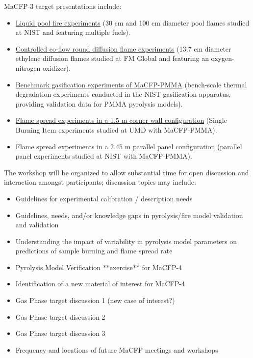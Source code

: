 \documentclass[12pt]{article}
\begin{document}
MaCFP-3 target presentations include:
\begin{itemize}[noitemsep]
\item \href{https://github.com/MaCFP/macfp-db/tree/master/Liquid_Pool_Fires/NIST_Pool_Fires}{Liquid pool fire experiments} (30 cm and 100 cm diameter pool flames studied at NIST and featuring multiple fuels).
\item \href{https://github.com/MaCFP/macfp-db/tree/master/Extinction/FM_Burner}{Controlled co-flow round diffusion flame experiments} (13.7 cm diameter ethylene diffusion flames studied at FM Global and featuring an oxygen-nitrogen oxidizer).
\item \href{https://github.com/MaCFP/macfp-db/tree/master/PMMA/Validation_Data/NIST_Gasification_Apparatus}{Benchmark gasification experiments of MaCFP-PMMA} (bench-scale thermal degradation experiments conducted in the NIST gasification apparatus, providing validation data for PMMA pyrolysis models).
\item \href{https://github.com/MaCFP/macfp-db/tree/master/Fire_Growth/UMD_SBI}{Flame spread experiments in a 1.5 m corner wall configuration} (Single Burning Item experiments studied at UMD with MaCFP-PMMA).
\item \href{https://github.com/MaCFP/macfp-db/tree/master/Fire_Growth/NIST_Parallel_Panel}{Flame spread experiments in a 2.45 m parallel panel configuration} (parallel panel experiments studied at NIST with MaCFP-PMMA).
 \end{itemize}
 
\newpage
The workshop will be organized to allow substantial time for open discussion and interaction amongst participants; discussion topics may include:

\begin{itemize}[noitemsep]
\item Guidelines for experimental calibration / description needs
\item Guidelines, needs, and/or knowledge gaps in pyrolysis/fire model validation and validation
\item Understanding the impact of variability in pyrolysis model parameters on predictions of sample burning and flame spread rate
\item Pyrolysis Model Verification **exercise** for MaCFP-4
\item Identification of a new material of interest for MaCFP-4
\item Gas Phase target discussion 1 (new case of interest?)
\item Gas Phase target discussion 2
\item Gas Phase target discussion 3
\item Frequency and locations of future MaCFP meetings and workshops
\end{itemize}
\end{document}

